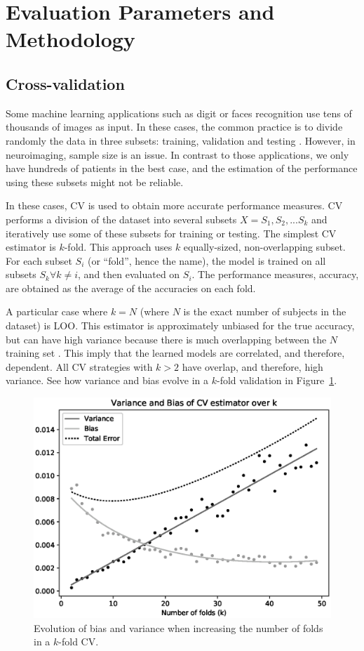 \section{Evaluation Parameters and Methodology}\label{sec:validation}
\subsection{Cross-validation}
Some machine learning applications such as digit or faces recognition use tens of thousands of images as input. In these cases, the common practice is to divide randomly the data in three subsets: training, validation and testing \cite{Bradley1997}. However, in neuroimaging, sample size is an issue. In contrast to those applications, we only have hundreds of patients in the best case, and the estimation of the performance using these subsets might not be reliable. 
 
In these cases, \acf{CV} is used to obtain more accurate performance measures. \ac{CV} performs a division of the dataset into several subsets $X = {S_1, S_2, ... S_k}$ and iteratively use some of these subsets for training or testing. The simplest \ac{CV} estimator is $k$-fold. This approach uses $k$ equally-sized, non-overlapping subset. For each subset $S_i$ (or ``fold'', hence the name), the model is trained on all subsets $S_k \forall k \neq i$, and then evaluated on $S_i$. The performance measures, \eg accuracy, are obtained as the average of the accuracies on each fold. 

A particular case where $k=N$ (where $N$ is the exact number of subjects in the dataset) is \acf{LOO}. This estimator is approximately unbiased for the true accuracy, but can have high variance because there is much overlapping between the $N$ training set \cite{Hastie2009}. This imply that the learned models are correlated, and therefore, dependent. All \ac{CV} strategies with $k>2$ have overlap, and therefore, high variance. See how variance and bias evolve in a $k$-fold validation in Figure~\ref{fig:evolutionKFold}. 

\begin{figure}
\centering
\includegraphics[width=0.7\linewidth]{Graphics/ch3/evolutionKFold}
\caption[Evolution of bias and variance in \acs{CV}.]{Evolution of bias and variance when increasing the number of folds in a $k$-fold \ac{CV}.}
\label{fig:evolutionKFold}
\end{figure}


